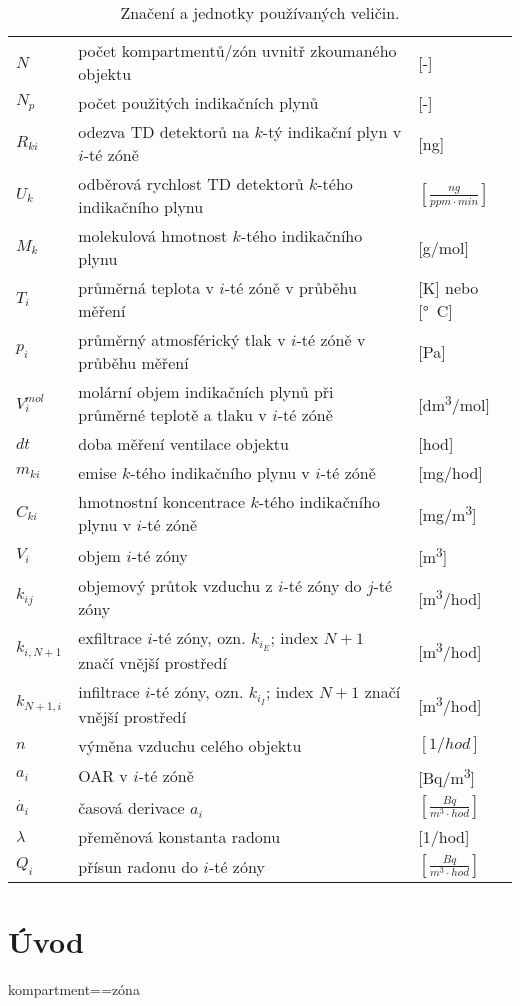 \begin{table}[p]
\def\arraystretch{1.2}
    \centering
    \caption{Značení a jednotky používaných veličin.}
    \label{tab:veliciny}
    \begin{tabular}{lp{}l}
        \toprule
        $N$   & počet kompartmentů/zón uvnitř zkoumaného objektu&[-]\\
        $N_p$ & počet použitých indikačních plynů & [-]\\
        $R_{ki}$ & odezva TD detektorů na $k$-tý indikační plyn v $i$-té zóně &[\si{ng}]\\
        $U_k$ & odběrová rychlost TD detektorů $k$-tého indikačního plynu &$\left[\si{\frac{ng}{ppm\cdot min}}\right]$\\
        $M_{k}$ & molekulová hmotnost $k$-tého indikačního plynu &[\si{g/mol}]\\
        $T_i$ & průměrná teplota v $i$-té zóně v průběhu měření& [K] nebo [\si{\degree C}]\\
        $p_i$ & průměrný atmosférický tlak v $i$-té zóně v průběhu měření& [Pa]\\
        $V_{i}^{mol}$ & molární objem indikačních plynů při průměrné teplotě a tlaku v $i$-té zóně&[\si{dm^3/mol}]\\ 
        $dt$& doba měření ventilace objektu & [hod]\\
        $m_{ki}$ & emise $k$-tého indikačního plynu v $i$-té zóně & [\si{mg/hod}]\\
        $C_{ki}$ & hmotnostní koncentrace $k$-tého indikačního plynu v $i$-té zóně& [\si{mg/m^3}] \\
        $V_i$ & objem $i$-té zóny& [\si{m^3}] \\
        $k_{ij}$ & objemový průtok vzduchu z $i$-té zóny do $j$-té zóny& [\si{m^3/hod}]\\
        $k_{i, N+1}$ & exfiltrace $i$-té zóny, ozn. $k_{i_E}$; index $N+1$ značí vnější prostředí & [\si{m^3/hod}]\\
        $k_{N+1, i}$ & infiltrace $i$-té zóny, ozn. $k_{i_I}$; index $N+1$ značí vnější prostředí &[\si{m^3/hod}]\\
        $n$   & výměna vzduchu celého objektu & $[\si{1/hod}]$\\
        $a_i$ & OAR v $i$-té zóně& [\si{Bq/m^3}] \\
        $\dot{a_i}$ & časová derivace $a_i$ & $\left[\si{\frac{Bq}{m^3\cdot hod}}\right]$ \\
        $\lambda$ & přeměnová konstanta radonu& [\si{1/hod}]\\
        $Q_i$ & přísun radonu do $i$-té zóny& $\left[\si{\frac{Bq}{m^3\cdot hod}}\right]$ \\
        \bottomrule
    \end{tabular}
\end{table}
\chapter{Úvod}
kompartment==zóna

